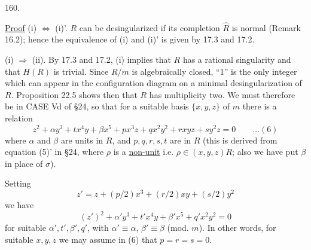 160.

\uline{Proof} (i) $\Leftrightarrow$ (i)'. $R$ can be desingularized if its completion $\widehat R$ is normal (Remark 16.2); hence the equivalence of (i) and (i)' is given by 17.3 and 17.2.

(i) $\Rightarrow$ (ii). By 17.3 and 17.2, (i) implies that $R$ has a rational singularity and that $H(R)$ is trivial. Since $R/m$ is algebraically closed, ``1'' is the only integer which can appear in the configuration diagram on a minimal desingularization of $R$. Proposition 22.5 shows then that $R$ has multiplicity two. We must therefore be in CASE Vd of \S24, so that for a suitable basis $\{x,y,z\}$ of $m$ there is a relation
\[
z^2+\alpha y^3+tx^4y+\beta x^5+px^3z+qx^2y^2+rxyz+sy^2z=0
\qquad\ldots(6)
\]
where $\alpha$ and $\beta$ are units in $R$, and $p,q,r,s,t$ are in $R$ (this is derived from equation (5)' in \S24, where $\rho$ is a \uline{non-unit} i.e. $\rho\in(x,y,z)R$; also we have put $\beta$ in place of $\sigma$).

Setting
\[
z'=z+(p/2)x^3+(r/2)xy+(s/2)y^2
\]
we have
\[
(z')^2+\alpha'y^3+t'x^4y+\beta'x^5+q'x^2y^2=0
\]
for suitable $\alpha',t',\beta',q'$, with $\alpha'\equiv\alpha$, $\beta'\equiv\beta$ (mod. $m$). In other words, for suitable $x,y,z$ we may assume in (6) that $p=r=s=0$.
